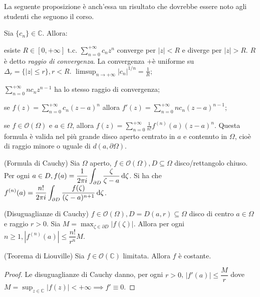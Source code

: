 La seguente proposizione è anch'essa un risultato che dovrebbe essere noto agli studenti che seguono il corso.

\begin{prop}
  Sia $\{c_n\} \in \mathbb{C}$. Allora:
  \begin{nlist}
    \item esiste $R \in [0, +\infty]$ t.c. $\displaystyle \sum_{n=0}^{+\infty} c_nz^n$ converge per $|z|<R$ e diverge per $|z|>R$. $R$ è detto \textit{raggio di convergenza}. La convergenza +è uniforme su $\Delta_r=\{|z| \le r\}, r<R$. $\displaystyle \limsup_{n \longrightarrow +\infty} |c_n|^{1/n}=\frac{1}{R}$;
    \item $\displaystyle \sum_{n=0}^{+\infty} nc_nz^{n-1}$ ha lo stesso raggio di convergenza;
    \item se $\displaystyle f(z)=\sum_{n=0}^{+\infty} c_n(z-a)^n$ allora $f'(z)=\sum_{n=0}^{+\infty} nc_n(z-a)^{n-1}$;
    \item se $f \in \mathcal{O}(\Omega)$ e $a \in \Omega$, allora $\displaystyle f(z)=\sum_{n=0}^{+\infty} \frac{1}{n!}f^{(n)}(a)(z-a)^n$. Questa formula è valida nel più grande disco aperto centrato in $a$ e contenuto in $\Omega$, cioè di raggio minore o uguale di $d(a, \partial \Omega)$.
  \end{nlist}
\end{prop}

\begin{thm}
  (Formula di Cauchy) Sia $\Omega$ aperto, $f \in \mathcal{O}(\Omega), D \subseteq \Omega$ disco/rettangolo chiuso. Per ogni $\displaystyle a \in D, f(a)=\frac{1}{2\pi i} \int_{\partial D} \frac{\zeta}{\zeta-a} \mathop{}\!\mathrm{d}\zeta$.
  Si ha che $\displaystyle f^{(n)}(a)=\frac{n!}{2\pi i} \int_{\partial D} \frac{f(\zeta)}{(\zeta-a)^{n+1}}\mathop{}\!\mathrm{d} \zeta$.
\end{thm}

\begin{cor}
  (Disuguaglianze di Cauchy) $f \in \mathcal{O}(\Omega), D=D(a, r) \subseteq \Omega$ disco di centro $a \in \Omega$ e raggio $r>0$. Sia $\displaystyle M=\max_{\zeta \in \partial D} |f(\zeta)|$. Allora per ogni $n \ge 1, |f^{(n)}(a)| \le \dfrac{n!}{r^n}M$.
\end{cor}

\begin{cor} \label{liou}
  (Teorema di Liouville) Sia $f \in \mathcal{O}(\mathbb{C})$ limitata. Allora $f$ è costante.
\end{cor}

\begin{proof}
  Le disuguaglianze di Cauchy danno, per ogni $r>0$, $|f'(a)| \le \dfrac{M}{r}$ dove $\displaystyle M=\sup_{z \in \mathbb{C}} |f(z)|<+\infty \implies
  f' \equiv 0$.
\end{proof}

